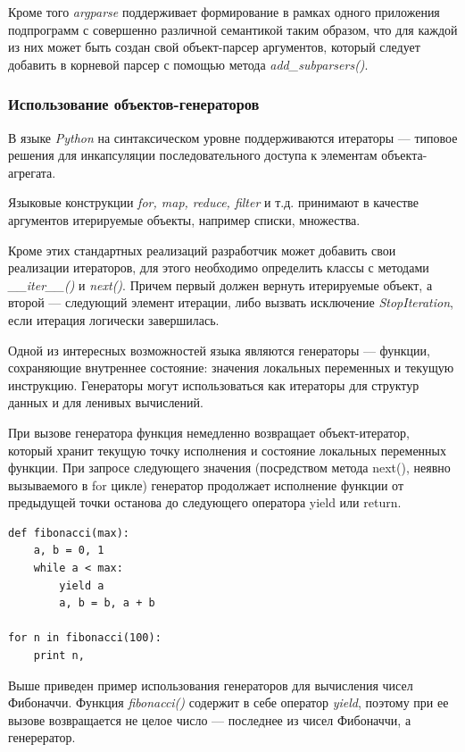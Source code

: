 Кроме того \textit{argparse} поддерживает формирование в рамках одного приложения
подпрограмм с совершенно различной семантикой таким образом, что
для каждой из них может быть создан свой объект-парсер аргументов,
который следует добавить в корневой парсер с помощью метода \textit{add\_subparsers()}.

\subsubsection{Использование объектов-генераторов}
\label{ssn:generators}
В языке \textit{Python} на синтаксическом уровне поддерживаются итераторы\cite{gamma} ---
типовое решения для инкапсуляции последовательного доступа к элементам объекта-агрегата.

Языковые конструкции \textit{for, map, reduce, filter} и т.д. принимают в качестве аргументов
итерируемые объекты, например списки, множества.

Кроме этих стандартных реализаций разработчик может добавить свои реализации итераторов,
для этого необходимо определить классы с методами \textit{\_\_iter\_\_()} и \textit{next()}.
Причем первый должен вернуть итерируемые объект, а второй --- следующий элемент итерации, либо 
вызвать исключение \textit{StopIteration}, если итерация логически завершилась.

Одной из интересных возможностей языка являются генераторы --- функции, 
сохраняющие внутреннее состояние: значения локальных переменных и текущую инструкцию. 
Генераторы могут использоваться как итераторы для структур данных и для ленивых вычислений.

При вызове генератора функция немедленно возвращает объект-итератор, 
который хранит текущую точку исполнения и состояние локальных переменных функции. 
При запросе следующего значения (посредством метода next(), неявно вызываемого в for цикле) 
генератор продолжает исполнение функции от предыдущей точки останова до следующего оператора yield или return.

\begin{lstlisting}[frame=single]
def fibonacci(max):        
    a, b = 0, 1
    while a < max:
        yield a            
        a, b = b, a + b    

for n in fibonacci(100):   
    print n,               

\end{lstlisting}

Выше приведен пример использования генераторов для вычисления чисел Фибоначчи.
Функция \textit{fibonacci()} содержит в себе оператор \textit{yield}, поэтому при ее вызове
возвращается не целое число --- последнее из чисел Фибоначчи, а генерератор.

